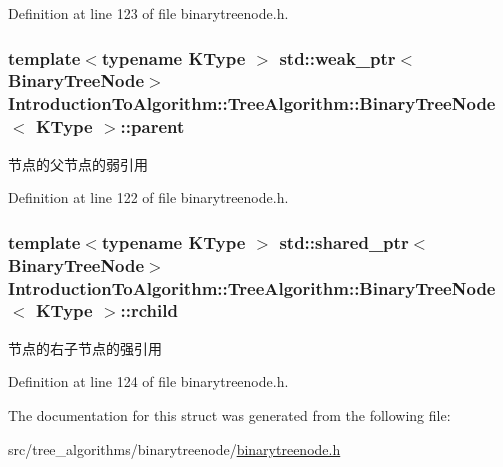 Definition at line 123 of file binarytreenode.\+h.

\hypertarget{struct_introduction_to_algorithm_1_1_tree_algorithm_1_1_binary_tree_node_aa94cbc785416ba74505661baac55a9fd}{}
\subsubsection[{parent}]{\setlength{\rightskip}{0pt plus 5cm}template$<$typename K\+Type $>$ std\+::weak\+\_\+ptr$<${\bf Binary\+Tree\+Node}$>$ {\bf Introduction\+To\+Algorithm\+::\+Tree\+Algorithm\+::\+Binary\+Tree\+Node}$<$ K\+Type $>$\+::parent}\label{struct_introduction_to_algorithm_1_1_tree_algorithm_1_1_binary_tree_node_aa94cbc785416ba74505661baac55a9fd}
节点的父节点的弱引用 

Definition at line 122 of file binarytreenode.\+h.

\hypertarget{struct_introduction_to_algorithm_1_1_tree_algorithm_1_1_binary_tree_node_aaccc444db582ed362bff4e50efbc47c7}{}
\subsubsection[{rchild}]{\setlength{\rightskip}{0pt plus 5cm}template$<$typename K\+Type $>$ std\+::shared\+\_\+ptr$<${\bf Binary\+Tree\+Node}$>$ {\bf Introduction\+To\+Algorithm\+::\+Tree\+Algorithm\+::\+Binary\+Tree\+Node}$<$ K\+Type $>$\+::rchild}\label{struct_introduction_to_algorithm_1_1_tree_algorithm_1_1_binary_tree_node_aaccc444db582ed362bff4e50efbc47c7}
节点的右子节点的强引用 

Definition at line 124 of file binarytreenode.\+h.



The documentation for this struct was generated from the following file\+:\begin{DoxyCompactItemize}
\item 
src/tree\+\_\+algorithms/binarytreenode/\hyperlink{binarytreenode_8h}{binarytreenode.\+h}\end{DoxyCompactItemize}
